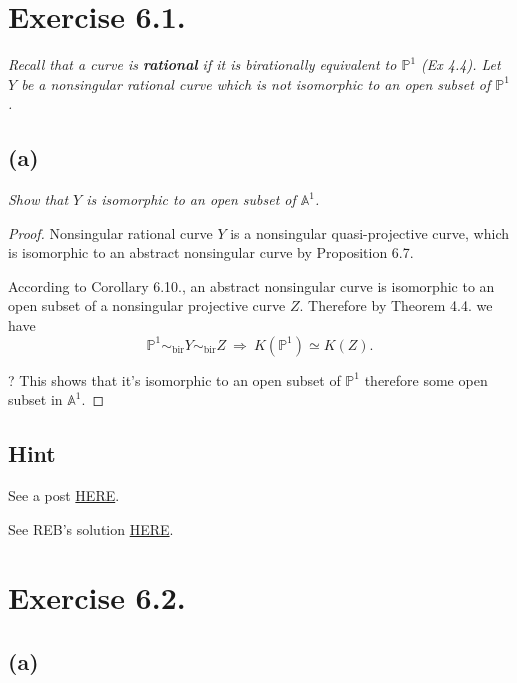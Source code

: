\section{Exercise 6.1.}

\textit{Recall that a curve is \textbf{rational} if it is birationally equivalent to $\mathbb P^1$ (Ex 4.4). Let $Y$ be a nonsingular rational curve which is not isomorphic to an open subset of $\mathbb P^1$.}

\subsection{(a)}
\textit{Show that $Y$ is isomorphic to an open subset of $\mathbb A^1$.}

\begin{proof}
    Nonsingular rational curve $Y$ is a nonsingular quasi-projective curve, which is isomorphic to an abstract nonsingular curve by Proposition 6.7.

    According to Corollary 6.10., an abstract nonsingular curve is isomorphic to an open subset of a nonsingular projective curve $Z$. Therefore by Theorem 4.4. we have \[\mathbb P^1\sim_{\text{bir}}Y\sim_{\text{bir}}Z ~\Rightarrow~ K(\mathbb P^1)\simeq K(Z).\]

    ? This shows that it's isomorphic to an open subset of $\mathbb P^1$ therefore some open subset in $\mathbb A^1$.

\end{proof}

\subsection{Hint}

See a post \href{https://math.stackexchange.com/questions/4193108/abstract-nonsingular-curve-birational-to-mathbbp1-is-isomorphic-to-mat}{HERE}.

See REB's solution \href{https://math.berkeley.edu/~reb/courses/256A/1.6.pdf}{HERE}.


\section{Exercise 6.2.}

\subsection{(a)}

